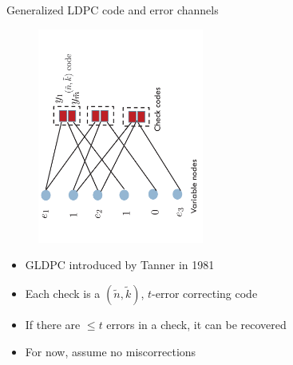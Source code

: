 \begin{frame}{Generalized LDPC code and error channels}
\vspace{-7mm}
\begin{figure}[t]
\centering
\includegraphics[width=2.15in,angle=-90]{./Figures/GLDPC}
\end{figure}

\begin{block}{}
\begin{itemize}
\item GLDPC introduced by Tanner in 1981
\item Each check is a $(\tilde{n},\tilde{k})$, $t$-error correcting code
\item If there are $\leq t$ errors in a check, it can be recovered
\item For now, assume no miscorrections
\end{itemize}
\end{block}
\end{frame}
